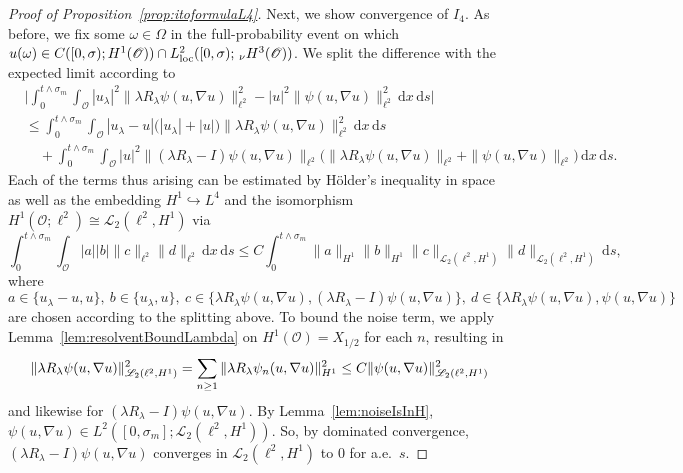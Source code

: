 \documentclass[reqno]{amsart}
\newcommand{\sL}{\mathscr{L}}
\newcommand{\sO}{\mathscr{O}}
\newcommand{\hra}{\hookrightarrow}
\newcommand{\1}{\mathbf{1}}
\newcommand{\grad}{\nabla}
\newcommand{\ds}{\,\mathrm{d}s}
\newcommand{\dx}{\,\mathrm{d}x}
\newcommand{\inttm}{\int_0^{t\wedge\sigma_m}}
\newcommand{\intsO}{\int_{\sO}}
\newcommand{\loc}{\textup{loc}}
\newcommand{\nH}{\ensuremath{\,_\nu H}}
\begin{document}
\begin{proof}[Proof of Proposition~\ref{prop:itoformulaL4}]
Next, we show convergence of $I_4$. As before,  we fix some $\omega \in \Omega$ in the full-probability event on which $u(\omega)\in C([0,\sigma);H^1(\sO))\cap L^2_{\loc}([0,\sigma);\nH^3(\sO))$. We split the difference with the expected limit according to
\begin{equation}\label{eq:Lemma311-eqI4-difference}
\begin{aligned}
& \Big|\inttm\intsO |u_\lambda|^2 \|\lambda R_\lambda \psi(u,\grad u)\|_{\ell^2}^2 
- |u|^2 \|\psi(u,\grad u)\|_{\ell^2}^2 \dx \ds \Big| \\
& \leq \inttm\intsO |u_\lambda-u| \big(|u_\lambda|+|u|\big) \|\lambda R_\lambda \psi(u,\grad u)\|_{\ell^2}^2 \dx \ds \\
&\quad + \inttm\intsO |u|^2 \|(\lambda R_\lambda-I) \psi(u,\grad u)\|_{\ell^2}\big( \|\lambda R_\lambda \psi(u,\grad u)\|_{\ell^2} + \|\psi(u,\grad u)\|_{\ell^2}\big) \dx \ds. 
\end{aligned}
\end{equation}
Each of the terms thus arising can be estimated by Hölder's inequality in space as well as the embedding $H^1\hra L^4$ and the isomorphism $H^1(\sO;\ell^2)\cong \sL_2(\ell^2,H^1)$ via
\begin{equation}\label{eq:Lemma311-eqI4-difference-2}
\inttm\intsO |a| |b| \|c\|_{\ell^2} \|d\|_{\ell^2} \dx \ds \leq C \inttm \|a\|_{H^1}\|b\|_{H^1} \|c\|_{\sL_2(\ell^2,H^1)} \|d\|_{\sL_2(\ell^2,H^1)}
\ds, 
\end{equation}
where 
\begin{equation*}
    a\in \{u_\lambda-u,u\},~ b \in \{u_\lambda, u\},~ c \in \{\lambda R_\lambda\psi(u,\grad u), (\lambda R_\lambda-I)\psi(u,\grad u)\},~ d\in \{\lambda R_\lambda\psi(u,\grad u), \psi(u,\grad u)\}
\end{equation*}
are chosen according to the splitting above. 
To bound the noise term, we apply Lemma~\ref{lem:resolventBoundLambda} on  $H^1(\sO)=X_{1/2}$ for each $n$, resulting in
\begin{equation*}
   \|\lambda R_\lambda \psi(u,\grad u)\|_{\sL_2(\ell^2,H^1)}^2 =  \sum_{n \geq 1} \|
 \lambda R_\lambda \psi_n(u,\grad u)\|_{H^1}^2 \\
    \le C \|\psi(u,\grad u)\|_{\sL_2(\ell^2,H^1)}^2 
\end{equation*}
 and likewise for $(\lambda R_\lambda-I) \psi(u,\grad u)$. By Lemma~\ref{lem:noiseIsInH}, $\psi(u,\grad u) \in L^2([0,\sigma_m]; \sL_2(\ell^2,H^1))$. So, by dominated convergence, $(\lambda R_\lambda-I) \psi(u,\grad u)$ converges in $\sL_2(\ell^2,H^1)$ to $0$ for a.e.\ $s$. 

\end{proof}
\end{document}
